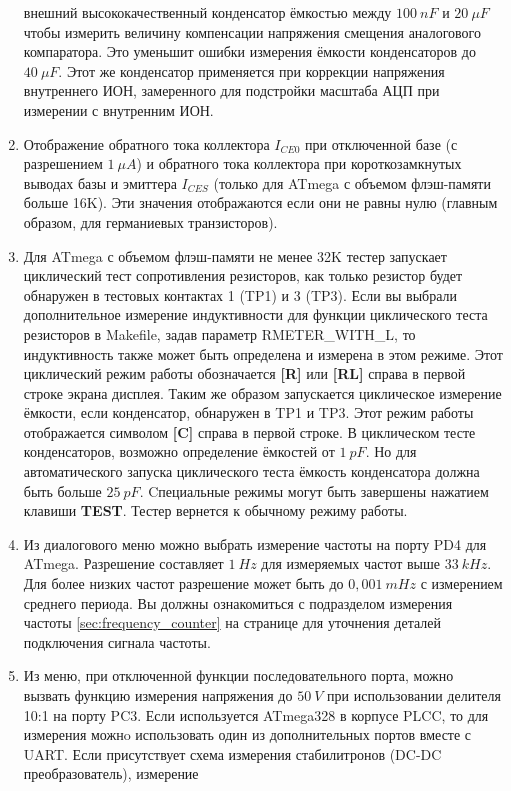 \begin{enumerate}
внешний высококачественный конденсатор ёмкостью между \(100~nF\) и \(20~\mu F\) чтобы измерить величину компенсации 
напряжения смещения аналогового компаратора. Это уменьшит ошибки измерения ёмкости конденсаторов до \(40~\mu F\).
Этот же конденсатор применяется при коррекции напряжения внутреннего ИОН, замеренного для подстройки масштаба АЦП при 
измерении с внутренним ИОН.
\item Отображение обратного тока коллектора \(I_{CE0}\) при отключенной базе (с разрешением \(1~\mu A\)) и
обратного тока коллектора при короткозамкнутых выводах базы и эмиттера \(I_{CES}\) 
(только для ATmega с объемом флэш-памяти больше 16K).
Эти значения отображаются если они не равны нулю (главным образом, для германиевых транзисторов).
\item Для ATmega с объемом флэш-памяти не менее 32K тестер запускает циклический тест сопротивления резисторов,
как только резистор будет обнаружен в тестовых контактах 1 (TP1) и 3 (TP3).
Если вы выбрали дополнительное измерение индуктивности для функции циклического теста резисторов в
Makefile, задав параметр RMETER\_WITH\_L, то индуктивность также может быть определена и измерена в этом режиме.
Этот циклический режим работы обозначается \textbf{[R]} или \textbf{[RL]} справа в первой строке экрана дисплея.
Таким же образом запускается циклическое измерение ёмкости, если конденсатор, обнаружен в TP1 и TP3.
Этот режим работы отображается символом \textbf{[C]} справа в первой строке.
В циклическом тесте конденсаторов, возможно определение ёмкостей от \(1~pF\). Но для автоматического запуска
циклического теста ёмкость конденсатора должна быть больше \(25~pF\).
Cпециальные режимы могут быть завершены нажатием клавиши \textbf{ TEST}.
Тестер вернется к обычному режиму работы.
\item Из диалогового меню можно выбрать измерение частоты на порту PD4 для ATmega.
Разрешение составляет \(1~Hz\) для измеряемых частот выше \(33~kHz\).
Для более низких частот разрешение может быть до \(0,001~mHz\) с измерением среднего периода.
Вы должны ознакомиться с подразделом измерения частоты \ref{sec:frequency_counter} на 
странице \pageref{sec:frequency_counter} для уточнения деталей подключения сигнала частоты. 
\item Из меню, при отключенной функции последовательного порта, можно вызвать функцию измерения напряжения
до \(50~V\) при использовании делителя 10:1 на порту PC3. Если используется ATmega328 в корпусе PLCC, то для измерения
можнo использовать один из дополнительных портов вместе с UART. 
Если присутствует схема измерения стабилитронов (DC-DC преобразователь), измерение 

\end{enumerate}
